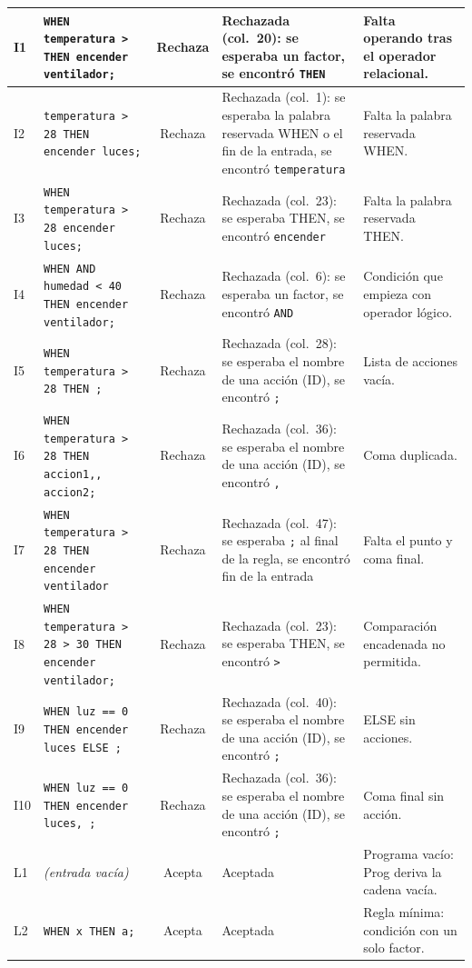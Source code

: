 \documentclass[12pt,a4paper]{article}
\begin{document}
{\begin{longtable}{|l|>{\raggedright\arraybackslash}p{4.5cm}|c|>{\raggedright\arraybackslash}p{4.3cm}|>{\raggedright\arraybackslash}p{3.4cm}|}
I1 & \texttt{WHEN temperatura \textgreater{} THEN encender ventilador;} & Rechaza & Rechazada (col.~20): se esperaba un factor, se encontró \texttt{THEN} & Falta operando tras el operador relacional.\\ \hline
I2 & \texttt{temperatura \textgreater{} 28 THEN encender luces;} & Rechaza & Rechazada (col.~1): se esperaba la palabra reservada WHEN o el fin de la entrada, se encontró \texttt{temperatura} & Falta la palabra reservada WHEN.\\ \hline
I3 & \texttt{WHEN temperatura \textgreater{} 28 encender luces;} & Rechaza & Rechazada (col.~23): se esperaba THEN, se encontró \texttt{encender} & Falta la palabra reservada THEN.\\ \hline
I4 & \texttt{WHEN AND humedad \textless{} 40 THEN encender ventilador;} & Rechaza & Rechazada (col.~6): se esperaba un factor, se encontró \texttt{AND} & Condición que empieza con operador lógico.\\ \hline
I5 & \texttt{WHEN temperatura \textgreater{} 28 THEN ;} & Rechaza & Rechazada (col.~28): se esperaba el nombre de una acción (ID), se encontró \texttt{;} & Lista de acciones vacía.\\ \hline
I6 & \texttt{WHEN temperatura \textgreater{} 28 THEN accion1{,}{,} accion2;} & Rechaza & Rechazada (col.~36): se esperaba el nombre de una acción (ID), se encontró \texttt{,} & Coma duplicada.\\ \hline
I7 & \texttt{WHEN temperatura \textgreater{} 28 THEN encender ventilador} & Rechaza & Rechazada (col.~47): se esperaba \texttt{;} al final de la regla, se encontró fin de la entrada & Falta el punto y coma final.\\ \hline
I8 & \texttt{WHEN temperatura \textgreater{} 28 \textgreater{} 30 THEN encender ventilador;} & Rechaza & Rechazada (col.~23): se esperaba THEN, se encontró \texttt{\textgreater{}} & Comparación encadenada no permitida.\\ \hline
I9 & \texttt{WHEN luz == 0 THEN encender luces ELSE ;} & Rechaza & Rechazada (col.~40): se esperaba el nombre de una acción (ID), se encontró \texttt{;} & ELSE sin acciones.\\ \hline
I10 & \texttt{WHEN luz == 0 THEN encender luces, ;} & Rechaza & Rechazada (col.~36): se esperaba el nombre de una acción (ID), se encontró \texttt{;} & Coma final sin acción.\\ \hline
L1 & \textit{(entrada vacía)} & Acepta & Aceptada & Programa vacío: Prog deriva la cadena vacía.\\ \hline
L2 & \texttt{WHEN x THEN a;} & Acepta & Aceptada & Regla mínima: condición con un solo factor.\\ \hline

\end{longtable}}
\end{document}
